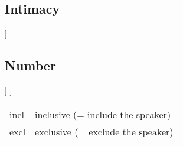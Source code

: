 \documentclass[12pt]{article}
\begin{document}
\subsection{Intimacy}
\begin{forest}
	[
		[\textsf{close}]
		[\textsf{remote}]
	]
\end{forest}

\subsection{Number}
\begin{forest}
	[
		[\textsf{sg}]
		[\textsf{pl}
			[\textsf{incl}]
			[\textsf{excl}]
		]
	]
\end{forest}

\begin{tabular}[!h]{ll}
	\toprule
	\textsf{incl} & inclusive (= include the speaker)\\
	\textsf{excl} & exclusive (= exclude the speaker)\\
	\bottomrule
\end{tabular}
\end{document}
